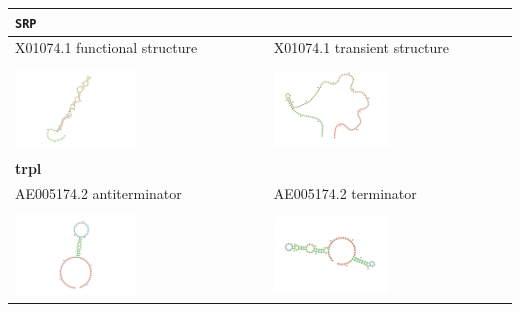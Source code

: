 \documentclass[ twoside,openright,titlepage,numbers=noenddot,headinclude,%
                footinclude=false, cleardoublepage=empty,abstractoff, %
                BCOR=5mm,paper=a4,fontsize=11pt,%
                ngerman,american,%
                ]{scrreprt}
\begin{document}
\begin{table}
\begin{tabular}{l|l}
  \hline
  \multicolumn{2}{l}{{\bf \texttt{SRP}}}\\
  \hline
X01074.1 functional structure & X01074.1 transient structure \\
\hline \\[5pt]
\includegraphics[width=0.5\textwidth]{./pictures/refStructure_pictures/X01074-1-functional-str.png} &
\includegraphics[width=0.5\textwidth]{./pictures/refStructure_pictures/X01074-1-transient-str.png} \\
\hline
  \multicolumn{2}{l}{{\bf trpl}}\\
  \hline
AE005174.2 antiterminator & AE005174.2 terminator\\
\hline \\[5pt]
\includegraphics[width=0.5\textwidth]{./pictures/refStructure_pictures/AE005174-2-alternative1-str.png} &
\includegraphics[width=0.5\textwidth]{./pictures/refStructure_pictures/AE005174-2-alternative2-str.png} \\

\end{tabular}
\end{table}
\end{document}
